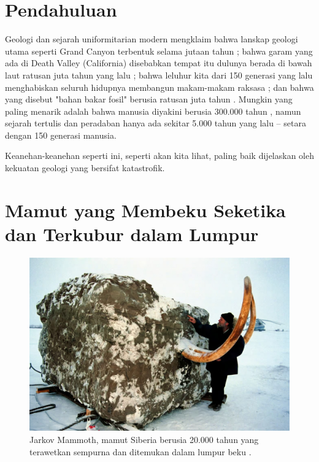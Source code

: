 \documentclass[10pt,twocolumn,letterpaper]{article}
\begin{document}

\section{Pendahuluan}

Geologi dan sejarah uniformitarian modern mengklaim bahwa lanskap geologi utama seperti Grand Canyon terbentuk selama jutaan tahun \cite{143}; bahwa garam yang ada di Death Valley (California) disebabkan tempat itu dulunya berada di bawah laut ratusan juta tahun yang lalu \cite{144}; bahwa leluhur kita dari 150 generasi yang lalu menghabiskan seluruh hidupnya membangun makam-makam raksasa \cite{29,70}; dan bahwa yang disebut "bahan bakar fosil" berusia ratusan juta tahun \cite{104}. Mungkin yang paling menarik adalah bahwa manusia diyakini berusia 300.000 tahun \cite{145}, namun sejarah tertulis dan peradaban hanya ada sekitar 5.000 tahun yang lalu – setara dengan 150 generasi manusia.

Keanehan-keanehan seperti ini, seperti akan kita lihat, paling baik dijelaskan oleh kekuatan geologi yang bersifat katastrofik.

\section{Mamut yang Membeku Seketika dan Terkubur dalam Lumpur}

\begin{figure}[t]
\begin{center}
   \includegraphics[width=1\linewidth]{jarkov-mammoth.jpg}
\end{center}
   \caption{Jarkov Mammoth, mamut Siberia berusia 20.000 tahun yang terawetkan sempurna dan ditemukan dalam lumpur beku \cite{51}.}
\label{fig:1}

\label{fig:onecol}
\end{figure}
\end{document}
